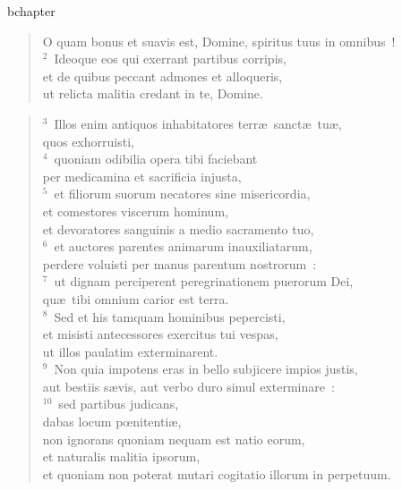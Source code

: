 bchapter\begin{flushleft}\begin{verse}\vspace{-19pt}\hspace{6pt}O quam bonus et suavis est, Domine, spiritus tuus in omnibus~!\\\hspace{6pt}
${}^{2}$~Ideoque eos qui exerrant partibus corripis,\\ et de quibus peccant admones et alloqueris,\\ ut relicta malitia credant in te, Domine.\end{verse}\end{flushleft}


\begin{flushleft}\begin{verse}${}^{3}$~Illos enim antiquos inhabitatores terr\ae\ sanct\ae\ tu\ae ,\\ quos exhorruisti,\\
${}^{4}$~quoniam odibilia opera tibi faciebant\\ per medicamina et sacrificia injusta,\\
${}^{5}$~et filiorum suorum necatores sine misericordia,\\ et comestores viscerum hominum,\\ et devoratores sanguinis a medio sacramento tuo,\\
${}^{6}$~et auctores parentes animarum inauxiliatarum,\\ perdere voluisti per manus parentum nostrorum~:\\
${}^{7}$~ut dignam perciperent peregrinationem puerorum Dei,\\ qu\ae\ tibi omnium carior est terra.\\
${}^{8}$~Sed et his tamquam hominibus pepercisti,\\ et misisti antecessores exercitus tui vespas,\\ ut illos paulatim exterminarent.\\
${}^{9}$~Non quia impotens eras in bello subjicere impios justis,\\ aut bestiis s\ae vis, aut verbo duro simul exterminare~:\\
${}^{10}$~sed partibus judicans,\\ dabas locum pœnitenti\ae ,\\ non ignorans quoniam nequam est natio eorum,\\ et naturalis malitia ipsorum,\\ et quoniam non poterat mutari cogitatio illorum in perpetuum.\\

\end{verse}
\end{flushleft}
